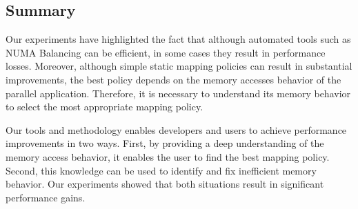 \subsection{Summary}

Our experiments have highlighted the fact that although automated tools such
as NUMA Balancing can be efficient, in some cases they result in
performance losses. Moreover, although simple static mapping policies
can result in substantial improvements, the best policy depends on the memory
accesses behavior of the parallel application. Therefore, it is necessary to understand its memory behavior to
select the most appropriate mapping policy.

Our tools and methodology enables developers and users to achieve performance improvements in two ways. First, by
providing a deep understanding of the memory access behavior, it enables the user to
find the best mapping policy. Second, this knowledge can be used to
identify and fix inefficient memory behavior. Our experiments showed that both
situations result in significant performance gains.
